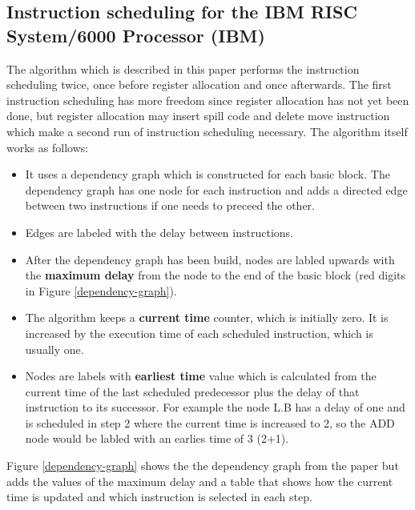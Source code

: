 \documentclass[a4paper,10pt]{article}
\begin{document}
\subsection{Instruction scheduling for the IBM RISC System/6000 Processor (IBM)}
The algorithm which is described in this paper performs the instruction scheduling twice, once before register allocation and once
afterwards. The first instruction scheduling has more freedom since register allocation has not yet been done, but register allocation
may insert spill code and delete move instruction which make a second run of instruction scheduling necessary. The algorithm itself works
as follows:
\begin{itemize}
 \item It uses a dependency graph which is constructed for each basic block. The dependency graph has one node for each instruction and
       adds a directed edge between two instructions if one needs to preceed the other.
 \item Edges are labeled with the delay between instructions.
 \item After the dependency graph has been build, nodes are labled upwards with the \textbf{maximum delay} from the node to the end of
       the basic block (red digits in Figure \ref{dependency-graph}).
 \item The algorithm keeps a \textbf{current time} counter, which is initially zero. It is increased by the execution time of each
       scheduled instruction, which is usually one.
 \item Nodes are labels with \textbf{earliest time} value which is calculated from the current time of the last scheduled predecessor
       plus the delay of that instruction to its successor. For example the node L.B has a delay of one and is scheduled in step 2 where
       the current time is increased to 2, so the ADD node would be labled with an earlies time of 3 (2+1).
\end{itemize}

Figure \ref{dependency-graph} shows the the dependency graph from the paper but adds the values of the maximum delay and a table that
shows how the current time is updated and which instruction is selected in each step.
\end{document}
